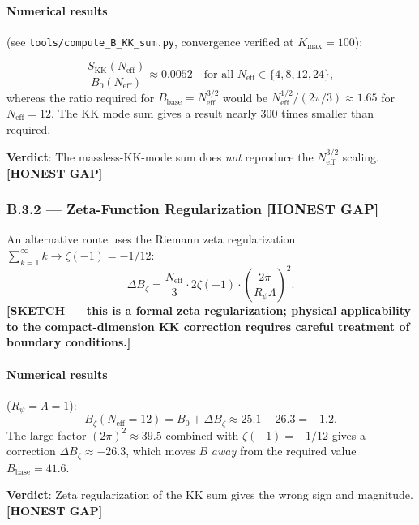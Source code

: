 \documentclass[11pt,a4paper]{article}
\theoremstyle{remark}
\begin{document}
\paragraph{Numerical results} (see \texttt{tools/compute\_B\_KK\_sum.py}, convergence
verified at $K_{\max} = 100$):

\begin{equation}
\frac{S_{\mathrm{KK}}(N_{\mathrm{eff}})}{B_0(N_{\mathrm{eff}})} \approx 0.0052
\quad \text{for all } N_{\mathrm{eff}} \in \{4, 8, 12, 24\},
\label{eq:KK-ratio}
\end{equation}
whereas the ratio required for $B_{\mathrm{base}} = N_{\mathrm{eff}}^{3/2}$ would be
$N_{\mathrm{eff}}^{1/2}/(2\pi/3) \approx 1.65$ for $N_{\mathrm{eff}} = 12$.
The KK mode sum gives a result nearly 300 times smaller than required.

\textbf{Verdict}: The massless-KK-mode sum does \emph{not} reproduce the
$N_{\mathrm{eff}}^{3/2}$ scaling.  \textbf{[HONEST GAP]}

\subsubsection*{B.3.2 — Zeta-Function Regularization  \textbf{[HONEST GAP]}}
\label{sec:B3-zeta}

An alternative route uses the Riemann zeta regularization $\sum_{k=1}^\infty k \to \zeta(-1) = -1/12$:
\begin{equation}
\Delta B_\zeta = \frac{N_{\mathrm{eff}}}{3} \cdot 2\zeta(-1) \cdot \left(\frac{2\pi}{R_\psi\Lambda}\right)^2.
\label{eq:DeltaB-zeta}
\end{equation}
\textbf{[SKETCH — this is a formal zeta regularization; physical applicability to
the compact-dimension KK correction requires careful treatment of boundary
conditions.]}

\paragraph{Numerical results} ($R_\psi = \Lambda = 1$):
\begin{equation}
B_\zeta(N_{\mathrm{eff}} = 12) = B_0 + \Delta B_\zeta \approx 25.1 - 26.3 = -1.2.
\label{eq:Bzeta-12}
\end{equation}
The large factor $(2\pi)^2 \approx 39.5$ combined with $\zeta(-1) = -1/12$ gives a
correction $\Delta B_\zeta \approx -26.3$, which moves $B$ \emph{away} from the
required value $B_{\mathrm{base}} = 41.6$.

\textbf{Verdict}: Zeta regularization of the KK sum gives the wrong sign and
magnitude.  \textbf{[HONEST GAP]}
\end{document}
